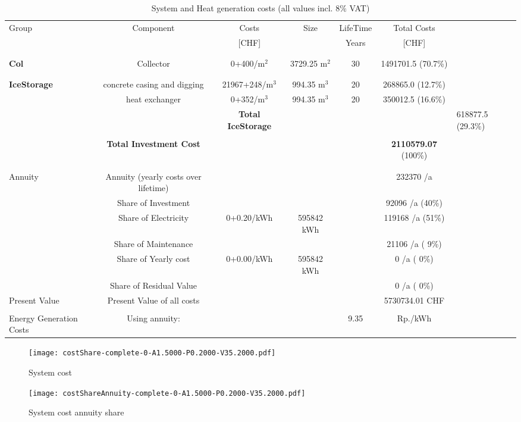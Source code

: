 \documentclass[english]{SPFShortReport}
\begin{document}
\begin{table}[!ht]
\centering
\caption{System and Heat generation costs (all values incl. 8$\%$ VAT) }
\begin{adjustbox}{max width =\textwidth}
\begin{tabular}{l | c c c c c } 
\hline
\hline
Group &Component &Costs &Size &LifeTime &Total Costs \\ 
 & &[CHF] & &Years &[CHF]\\ 
\hline
\\
\hline \\
\textbf{Col} & Collector & 0+400/m$^2$ & 3729.25 m$^2$ & 30 & 1491701.5 (70.7\%) \\
\hline \\
\hline \\
\textbf{IceStorage} & concrete casing and digging & 21967+248/m$^3$ & 994.35 m$^3$ & 20 & 268865.0 (12.7\%) \\
 & heat exchanger & 0+352/m$^3$ & 994.35 m$^3$ & 20 & 350012.5 (16.6\%) \\
&
 & \textbf{Total IceStorage} & & & & 618877.5 (29.3\%) \\
\hline \\
 & \textbf{Total Investment Cost} & & & & \textbf{2110579.07} (100\%) \\ 
\hline \\ 
\hline \\ 
Annuity & Annuity (yearly costs over lifetime)  &&& & 232370 /a  \\
 & Share of Investment & &&& 92096 /a (40\%) \\
 & Share of Electricity & 0+0.20/kWh & 595842 kWh &  & 119168 /a (51\%)\\
 & Share of Maintenance & &&& 21106 /a ( 9\%)\\ 
 & Share of Yearly cost & 0+0.00/kWh & 595842 kWh & &  0 /a ( 0\%)\\
 & Share of Residual Value &&& &  0 /a ( 0\%)\\
Present Value  & Present Value of all costs  & &&& 5730734.01 CHF \\
\hline \\ 
 Energy Generation Costs & Using annuity: &&& 9.35 & Rp./kWh \\
\hline
\hline
\end{tabular}
\end{adjustbox}
\label{CostsTable}
\end{table}
\begin{figure}[!htbp]
\begin{center}
\texttt{[image: costShare-complete-0-A1.5000-P0.2000-V35.2000.pdf]}
\caption{System cost}
\label{systemCost}
\end{center}
\end{figure}
\begin{figure}[!htbp]
\begin{center}
\texttt{[image: costShareAnnuity-complete-0-A1.5000-P0.2000-V35.2000.pdf]}
\caption{System cost annuity share}
\label{systemCostannuity}
\end{center}
\end{figure}
\end{document}
